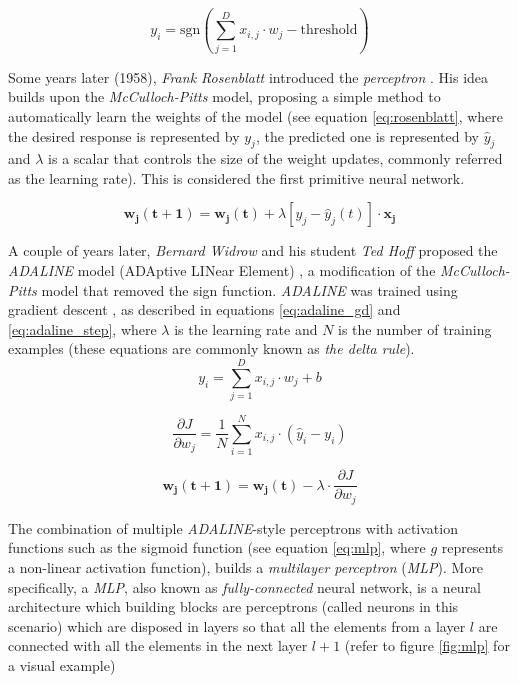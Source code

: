 \begin{equation}
	\label{eq:mcpitts}
	y_i = \mathrm{sgn}\left(\sum_{j=1}^{D} x_{i,j} \cdot w_{j} - \mathrm{threshold}\right)
\end{equation}

Some years later (1958), \textit{Frank Rosenblatt} introduced the \textit{perceptron} \autocite{Rosenblatt58}. His idea builds upon the \textit{McCulloch-Pitts} model, proposing a simple method to automatically learn the weights of the model (see equation \ref{eq:rosenblatt}, where the desired response is represented by $y_j$, the predicted one is represented by $\hat{y}_j$ and $\lambda$ is a scalar that controls the size of the weight updates, commonly referred as the learning rate). This is considered the first primitive neural network.

\begin{equation}
\label{eq:rosenblatt}
\mathbf{w_j(t+1)} = \mathbf{w_j(t)} + \lambda [ y_j-\hat{y}_j(t) ] \cdot \mathbf{x_j}
\end{equation}

 A couple of years later, \textit{Bernard Widrow} and his student \textit{Ted Hoff} proposed the \textit{ADALINE} model (ADAptive LINear Element) \autocite{widrow1960}, a modification of the \textit{McCulloch-Pitts} model that removed the sign function. \textit{ADALINE} was trained using gradient descent \autocite{fredric2000}, as described in equations \ref{eq:adaline_gd} and \ref{eq:adaline_step}, where $\lambda$ is the learning rate and $N$ is the number of training examples (these equations are commonly known as \textit{the delta rule}).
\begin{equation}
\label{eq:adaline_fp}
y_i = \sum_{j=1}^{D} x_{i,j} \cdot w_{j} + b
\end{equation}

\begin{equation}
\label{eq:adaline_gd}
\frac{\partial J}{\partial{w_j}} = \frac{1}{N} \sum_{i=1}^{N} x_{i,j} \cdot(\hat{y}_i - y_i)
\end{equation}

\begin{equation}
\label{eq:adaline_step}
\mathbf{w_j(t+1)} = \mathbf{w_j(t)} - \lambda \cdot \frac{\partial J}{\partial {w_j}}
\end{equation}


 The combination of multiple \textit{ADALINE}-style perceptrons with activation functions such as the sigmoid function (see equation \ref{eq:mlp}, where $g$ represents a non-linear activation function), builds a \textit{multilayer perceptron} (\textit{MLP}). More specifically, a \textit{MLP}, also known as \textit{fully-connected} neural network, is a neural architecture which building blocks are perceptrons (called neurons in this scenario) which are disposed in layers so that all the elements from a layer $l$ are connected with all the elements in the next layer $l+1$ (refer to figure \ref{fig:mlp} for a visual example)


